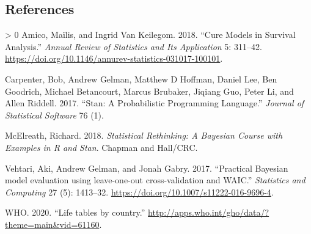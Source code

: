 \documentclass[
]{article}
\newlength{\cslhangindent}
\newenvironment{CSLReferences}[3] %
 {%
  \setlength{\parindent}{0pt}
  \ifodd #1 \everypar{\setlength{\hangindent}{\cslhangindent}}\ignorespaces\fi
  \ifnum #2 > 0
  \setlength{\parskip}{#2\baselineskip}
  \fi
 }%
 {}
\begin{document}
\hypertarget{references}{%
\subsection*{References}\label{references}}

\hypertarget{refs}{}
\begin{CSLReferences}{1}{0}
\leavevmode\hypertarget{ref-Amico2018}{}%
Amico, Maïlis, and Ingrid Van Keilegom. 2018. {``{Cure Models in
Survival Analysis}.''} \emph{Annual Review of Statistics and Its
Application} 5: 311--42.
\url{https://doi.org/10.1146/annurev-statistics-031017-100101}.

\leavevmode\hypertarget{ref-carpenter2017stan}{}%
Carpenter, Bob, Andrew Gelman, Matthew D Hoffman, Daniel Lee, Ben
Goodrich, Michael Betancourt, Marcus Brubaker, Jiqiang Guo, Peter Li,
and Allen Riddell. 2017. {``Stan: A Probabilistic Programming
Language.''} \emph{Journal of Statistical Software} 76 (1).

\leavevmode\hypertarget{ref-McElreath2018}{}%
McElreath, Richard. 2018. \emph{{Statistical Rethinking: A Bayesian
Course with Examples in R and Stan}}. Chapman and Hall/CRC.

\leavevmode\hypertarget{ref-Vehtari2017}{}%
Vehtari, Aki, Andrew Gelman, and Jonah Gabry. 2017. {``{Practical
Bayesian model evaluation using leave-one-out cross-validation and
WAIC}.''} \emph{Statistics and Computing} 27 (5): 1413--32.
\url{https://doi.org/10.1007/s11222-016-9696-4}.

\leavevmode\hypertarget{ref-wholifetables}{}%
WHO. 2020. {``{Life tables by country}.''}
\url{http://apps.who.int/gho/data/?theme=main\&vid=61160}.

\end{CSLReferences}
\end{document}
